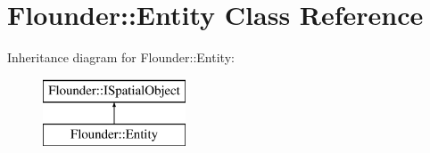 \hypertarget{class_flounder_1_1_entity}{}\section{Flounder\+:\+:Entity Class Reference}
\label{class_flounder_1_1_entity}
Inheritance diagram for Flounder\+:\+:Entity\+:\begin{figure}[H]
\begin{center}
\leavevmode
\includegraphics[height=2.000000cm]{class_flounder_1_1_entity}
\end{center}
\end{figure}
